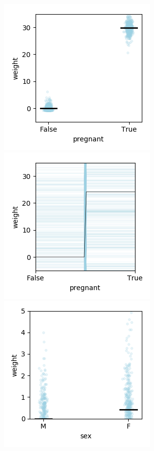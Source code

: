 \documentclass[12pt]{article}
\begin{document}
\begin{figure}[htbp]
\begin{center}
\includegraphics[scale=0.7]{images/pregnant_vs_weight_stratpd.png}
\includegraphics[scale=0.7]{images/pregnant_vs_weight_pdp.png}\\
\includegraphics[scale=0.7]{images/sex_vs_weight_stratpd.png}

\end{center}
\end{figure}
\end{document}
